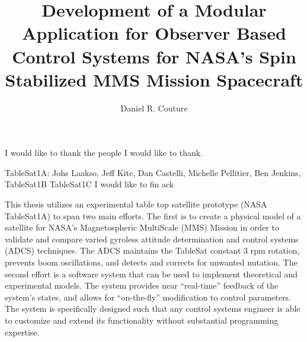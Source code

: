 \documentclass[11pt,doublespace]{unhthesis}
\begin{document}
\title{Development of a Modular Application for Observer Based Control Systems for NASA's Spin Stabilized MMS Mission Spacecraft}
\author{Daniel R. Couture}
\maketitle

\makecopyright

\makeapproval

\begin{dedication}
  I would like to thank the people I would like to thank.
\end{dedication}

\begin{acknowledgments}
  TableSat1A: Johs Laakso, Jeff Kite, Dan Castelli, Michelle Pellitier, Ben Jenkins,
  TableSat1B
  TableSat1C
    I would like to fin ack
\end{acknowledgments}

\begin{singlespace}
  \tableofcontents
  \listoftables
  \listoffigures
\end{singlespace}

\begin{abstractpage}
This thesis utilizes an experimental table top satellite prototype (NASA TableSat1A) to span two main efforts.  The first is to create a physical model of a satellite for NASA's Magnetospheric MultiScale (MMS) Mission in order to validate and compare varied gyroless attitude determination and control systems (ADCS) techniques.  The ADCS maintains the TableSat constant 3 rpm rotation, prevents boom oscillations, and detects and corrects for unwanted nutation.  The second effort is a software system that can be used to implement theoretical and experimental models.  The system provides near ``real-time'' feedback of the system's states, and allows for ``on-the-fly'' modification to control parameters.  The system is specifically designed such that any control systems engineer is able to customize and extend its functionality without substantial programming expertise.
\end{abstractpage}
\end{document}
